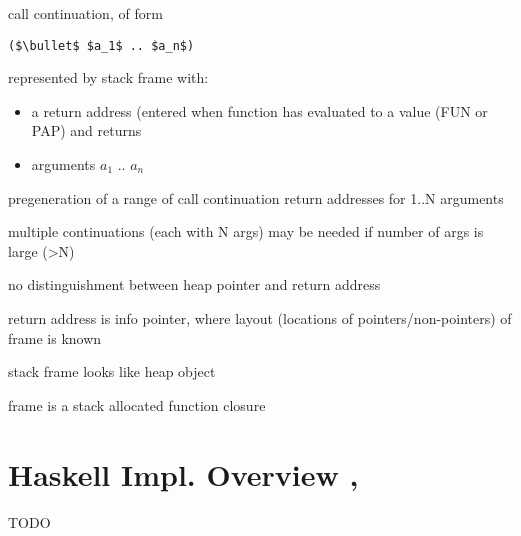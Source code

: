 \documentclass[8pt]{extarticle}
\begin{document}
\begin{multicols*}{2}
call continuation, of form
\begin{lstlisting}
($\bullet$ $a_1$ .. $a_n$)
\end{lstlisting}
represented by stack frame with:
\begin{itemize}
\item a return address (entered when function has evaluated to a value (FUN or PAP) and returns
\item arguments $a_1$ .. $a_n$
\end{itemize}

pregeneration of a range of call continuation return addresses for 1..N arguments

multiple continuations (each with N args)  may be needed if number of args is large (>N)

no distinguishment between heap pointer and return address

return address is info pointer, where layout (locations of pointers/non-pointers) of frame is known

stack frame looks like heap object

frame is a stack allocated function closure

\section{Haskell Impl. Overview \cite{wiki_STG}, \cite{terei2011}}

TODO



    
\end{multicols*}
\end{document}
